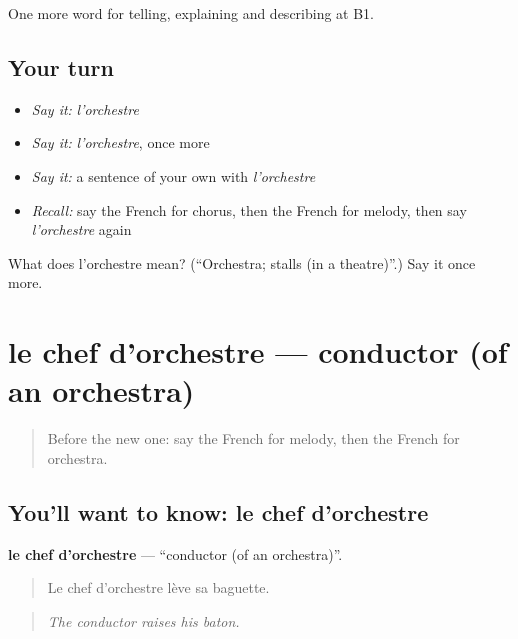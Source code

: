 \begin{grammarlens}[title={What you've built}]
One more word for telling, explaining and describing at B1.
\end{grammarlens}

\subsection*{Your turn}
\begin{itemize}
\raggedright
  \item \emph{Say it:} \emph{l'orchestre}
  \item \emph{Say it:} \emph{l'orchestre}, once more
  \item \emph{Say it:} a sentence of your own with \emph{l'orchestre}
  \item \emph{Recall:} say the French for chorus, then the French for melody, then say \emph{l'orchestre} again
\end{itemize}

\begin{tcolorbox}[breakable,colback=teal!4,colframe=teal!35!black,title={Before you move on}]
What does l'orchestre mean? (\textquotedblleft{}Orchestra; stalls (in a theatre)\textquotedblright{}.) Say it once more.
\end{tcolorbox}
\section[le chef d'orchestre]{le chef d'orchestre — conductor (of an orchestra)}

\label{lesson:FR-C513-chef-d-orchestre}



\begin{quote}
Before the new one: say the French for melody, then the French for orchestra.
\end{quote}

\subsection*{You'll want to know: le chef d'orchestre}
\textbf{le chef d'orchestre} — \textquotedblleft{}conductor (of an orchestra)\textquotedblright{}.

\begin{quote}
Le chef d'orchestre lève sa baguette.
\end{quote}

\begin{quote}
\emph{The conductor raises his baton.}
\end{quote}

